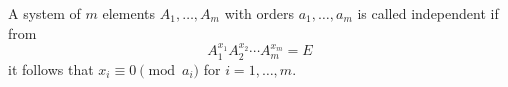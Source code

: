 A system of $m$ elements $A_1,\ldots,A_m$ with orders $a_1,\ldots,a_m$ is called independent if from
$$A_1^{x_1}A_2^{x_2}\cdots A_m^{x_m} = E$$
it follows that $x_i \equiv 0 \pmod{a_i}$ for $i=1,\ldots,m$.
